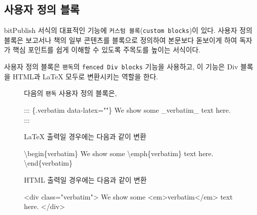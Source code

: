 \documentclass[
  letterpaper,
]{book}
\newenvironment{Shaded}{\begin{snugshade}}{\end{snugshade}}
\newcommand{\DataTypeTok}[1]{\textcolor[rgb]{0.68,0.00,0.00}{#1}}
\newcommand{\ErrorTok}[1]{\textcolor[rgb]{0.68,0.00,0.00}{#1}}
\newcommand{\ExtensionTok}[1]{\textcolor[rgb]{0.00,0.23,0.31}{#1}}
\newcommand{\KeywordTok}[1]{\textcolor[rgb]{0.00,0.23,0.31}{#1}}
\newcommand{\NormalTok}[1]{\textcolor[rgb]{0.00,0.23,0.31}{#1}}
\newcommand{\OtherTok}[1]{\textcolor[rgb]{0.00,0.23,0.31}{#1}}
\newcommand{\StringTok}[1]{\textcolor[rgb]{0.13,0.47,0.30}{#1}}
\newcommand{\VerbatimStringTok}[1]{\textcolor[rgb]{0.13,0.47,0.30}{#1}}
\begin{document}
\hypertarget{uxc0acuxc6a9uxc790-uxc815uxc758-uxbe14uxb85d}{%
\subsection{사용자 정의
블록}\label{uxc0acuxc6a9uxc790-uxc815uxc758-uxbe14uxb85d}}

bitPublish 서식의 대표적인 기능에
\texttt{커스텀\ 블록}(\texttt{custom\ blocks})\autocite{rmcook}이
있다. 사용자 정의 블록은 보고서나 책의 일부 콘텐츠를 블록으로 정의하여
본문보다 돋보이게 하여 독자가 핵심 포인트를 쉽게 이해할 수 있도록
주목도를 높이는 서식이다.

사용자 정의 블록은 \texttt{팬독}의 \texttt{fenced\ Div\ blocks} 기능을
사용하고, 이 기능은 Div 블록을 HTML과 LaTeX 모두로 변환시키는 역할을
한다.

\begin{figure}

다음의 \texttt{팬독} 사용자 정의 블록은,

\begin{Shaded}
\begin{Highlighting}[]
\NormalTok{::: \{.verbatim data{-}latex=""\}}
\NormalTok{We show some \_verbatim\_ text here.}
\NormalTok{:::}
\end{Highlighting}
\end{Shaded}

LaTeX 출력일 경우에는 다음과 같이 변환

\begin{Shaded}
\begin{Highlighting}[]
\KeywordTok{\textbackslash{}begin}\NormalTok{\{}\ExtensionTok{verbatim}\NormalTok{\}}
\VerbatimStringTok{We show some \textbackslash{}emph\{verbatim\} text here.}
\KeywordTok{\textbackslash{}end}\NormalTok{\{}\ExtensionTok{verbatim}\NormalTok{\}}
\end{Highlighting}
\end{Shaded}

HTML 출력일 경우에는 다음과 같이 변환

\begin{Shaded}
\begin{Highlighting}[]
\DataTypeTok{\textless{}}\KeywordTok{div} \ErrorTok{class}\OtherTok{=}\StringTok{"verbatim"}\DataTypeTok{\textgreater{}}
\NormalTok{We show some }\DataTypeTok{\textless{}}\KeywordTok{em}\DataTypeTok{\textgreater{}}\NormalTok{verbatim}\DataTypeTok{\textless{}/}\KeywordTok{em}\DataTypeTok{\textgreater{}}\NormalTok{ text here.}
\DataTypeTok{\textless{}/}\KeywordTok{div}\DataTypeTok{\textgreater{}}
\end{Highlighting}
\end{Shaded}

\end{figure}
\end{document}
